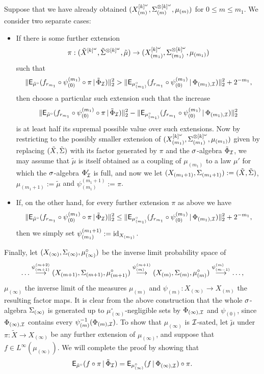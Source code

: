 \documentclass[11pt]{article}
\begin{document}
Suppose that we have already obtained $(X_{(m)}^{[k]^\o},\S^{\otimes
[k]^\o}_{(m)},\mu_{(m)})$ for $0 \leq m \leq m_1$.  We consider two
separate cases:
\begin{itemize}
\item If there is some further extension
\[\pi:(\tilde{X}^{[k]^\o},\tilde{\S}^{\otimes[k]^\o},\tilde{\mu})\to (X^{[k]^\o}_{(m_1)},\S_{(m_1)}^{\otimes [k]^\o},\mu_{(m_1)})\]
such that
\[\|\sfE_{\tilde{\mu}^\circ}(f_{r_{m_1}}\circ \psi^{(m_1)}_{(0)}\circ\pi\,|\,\tilde{\Phi}_\I)\|_2^2 > \|\sfE_{\mu_{(m_1)}^\circ}(f_{r_{m_1}}\circ \psi^{(m_1)}_{(0)}\,|\,\Phi_{(m_1),\I})\|_2^2 + 2^{-m_1},\]
then choose a particular such extension such that the increase
\[\|\sfE_{\tilde{\mu}^\circ}(f_{r_{m_1}}\circ \psi^{(m_1)}_{(0)}\circ\pi\,|\,\tilde{\Phi}_\I)\|_2^2 - \|\sfE_{\mu_{(m_1)}^\circ}(f_{r_{m_1}}\circ \psi^{(m_1)}_{(0)}\,|\,\Phi_{(m_1),\I})\|_2^2\]
is at least half its supremal possible value over such extensions.
Now by restricting to the possibly smaller extension of
$(X^{[k]^\o}_{(m_1)},\S_{(m_1)}^{\otimes [k]^\o},\mu_{(m_1)})$ given
by replacing $(\tilde{X},\tilde{\S})$ with its factor generated by
$\pi$ and the $\s$-algebra $\tilde{\Phi}_\I$, we may assume that
$\tilde{\mu}$ is itself obtained as a coupling of $\mu_{(m_1)}$ to a
law $\mu'$ for which the $\s$-algebra $\Phi'_\I$ is full, and now we
let $(X_{(m_1+1)},\S_{(m_1+1)}) := (\tilde{X},\tilde{\S})$,
$\mu_{(m_1 + 1)} := \tilde{\mu}$ and $\psi^{(m_1 + 1)}_{(m_1)} :=
\pi$.
\item If, on the other hand, for every further extension $\pi$ as above we
have
\[\|\sfE_{\tilde{\mu}^\circ}(f_{r_{m_1}}\circ
\psi^{(m_1)}_{(0)}\circ\pi\,|\,\tilde{\Phi}_\I)\|_2^2 \leq
\|\sfE_{\mu_{(m_1)}^\circ}(f_{r_{m_1}}\circ
\psi^{(m_1)}_{(0)}\,|\,\Phi_{(m_1),\I})\|_2^2 + 2^{-m_1},\] then we
simply set $\psi^{(m_1+1)}_{(m_1)}:= \id_{X_{(m_1)}}$.
\end{itemize}

Finally, let $(X_{(\infty)},\S_{(\infty)},\mu_{(\infty)}^\circ)$ be
the inverse limit probability space of
\[\ldots\stackrel{\psi^{(m+2)}_{(m+1)}}{\longrightarrow}(X_{(m+1)},\S_{(m+1)},\mu^\circ_{(m+1)})\stackrel{\psi^{(m+1)}_{(m)}}{\longrightarrow} (X_{(m)},\S_{(m)},\mu_{(m)}^\circ)\stackrel{\psi^{(m)}_{(m-1)}}{\longrightarrow}\ldots,\]
$\mu_{(\infty)}$ the inverse limit of the measures $\mu_{(m)}$ and
$\psi_{(m)}:X_{(\infty)}\to X_{(m)}$ the resulting factor maps. It
is clear from the above construction that the whole $\s$-algebra
$\S_{(\infty)}$ is generated up to $\mu_{(\infty)}^\circ$-negligible
sets by $\Phi_{(\infty),\I}$ and $\psi_{(0)}$, since
$\Phi_{(\infty),\I}$ contains every
$\psi_{(m)}^{-1}(\Phi_{(m),\I})$. To show that $\mu_{(\infty)}$ is
$\I$-sated, let $\tilde{\mu}$ under $\pi:\tilde{X}\to X_{(\infty)}$
be any further extension of $\mu_{(\infty)}$, and suppose that $f
\in L^\infty(\mu_{(\infty)})$. We will complete the proof by showing
that
\[\sfE_{\tilde{\mu}^\circ}(f\circ\pi\,|\,\tilde{\Phi}_\I) =
\sfE_{\mu_{(\infty)}^\circ}(f\,|\,\Phi_{(\infty),\I})\circ\pi.\]
\end{document}
